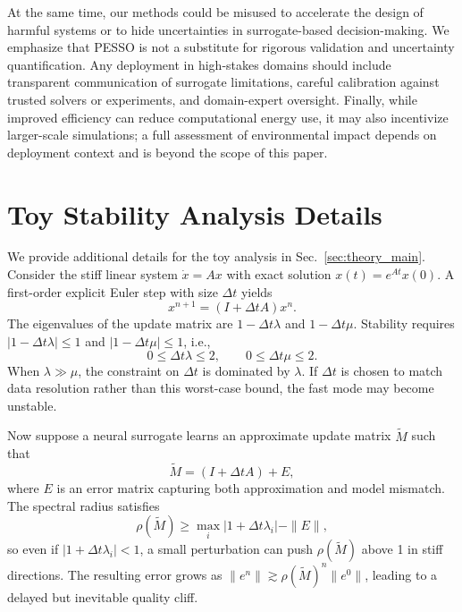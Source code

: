 \documentclass{article}
\theoremstyle{plain}
\theoremstyle{definition}
\theoremstyle{remark}
\begin{document}
At the same time, our methods could be misused to accelerate the design of harmful systems or to hide uncertainties in surrogate-based decision-making.
We emphasize that PESSO is not a substitute for rigorous validation and uncertainty quantification.
Any deployment in high-stakes domains should include transparent communication of surrogate limitations, careful calibration against trusted solvers or experiments, and domain-expert oversight.
Finally, while improved efficiency can reduce computational energy use, it may also incentivize larger-scale simulations; a full assessment of environmental impact depends on deployment context and is beyond the scope of this paper.





\clearpage
\onecolumn
\appendix

\section{Toy Stability Analysis Details}
\label{app:theory}

We provide additional details for the toy analysis in Sec.~\ref{sec:theory_main}.
Consider the stiff linear system $\dot{x} = Ax$ with exact solution $x(t) = e^{At}x(0)$.
A first-order explicit Euler step with size $\Delta t$ yields
\begin{equation}
  x^{n+1} = (I + \Delta t A) x^n.
\end{equation}
The eigenvalues of the update matrix are $1 - \Delta t \lambda$ and $1 - \Delta t \mu$.
Stability requires $|1 - \Delta t \lambda| \le 1$ and $|1 - \Delta t \mu| \le 1$, i.e.,
\begin{equation}
  0 \le \Delta t \lambda \le 2, 
  \qquad 
  0 \le \Delta t \mu \le 2.
\end{equation}
When $\lambda \gg \mu$, the constraint on $\Delta t$ is dominated by $\lambda$.
If $\Delta t$ is chosen to match data resolution rather than this worst-case bound, the fast mode may become unstable.

Now suppose a neural surrogate learns an approximate update matrix $\tilde{M}$ such that
\begin{equation}
  \tilde{M} = (I + \Delta t A) + E,
\end{equation}
where $E$ is an error matrix capturing both approximation and model mismatch.
The spectral radius satisfies
\begin{equation}
  \rho(\tilde{M}) \ge \max_i |1 + \Delta t \lambda_i| - \|E\|,
\end{equation}
so even if $|1 + \Delta t \lambda_i|<1$, a small perturbation can push $\rho(\tilde{M})$ above 1 in stiff directions.
The resulting error grows as $\|e^n\| \gtrsim \rho(\tilde{M})^n \|e^0\|$, leading to a delayed but inevitable quality cliff.
\end{document}

